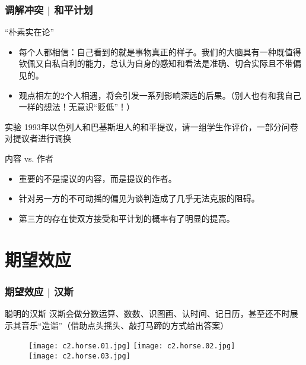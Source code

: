 \begin{frame}
  \frametitle{调解冲突 | 和平计划}
  \begin{block}{“朴素实在论”}
    \begin{itemize}
      \item 每个人都相信：自己看到的就是事物真正的样子。我们的大脑具有一种既值得钦佩又自私自利的能力，总认为自身的感知和看法是准确、切合实际且不带偏见的。
      \item 观点相左的2个人相遇，将会引发一系列影响深远的后果。（别人也有和我自己一样的想法！无意识“贬低”！）
    \end{itemize}
  \end{block}
  \vspace{-0.5em}
  \pause
  \begin{block}{实验}
    1993年以色列人和巴基斯坦人的和平提议，请一组学生作评价，一部分问卷对提议者进行调换
  \end{block}
  \vspace{-0.5em}
  \pause
  \begin{block}{\alert{内容 vs. 作者}}
    \begin{itemize}
      \item 重要的不是提议的内容，而是提议的作者。
      \item 针对另一方的不可动摇的偏见为谈判造成了几乎无法克服的阻碍。
      \item 第三方的存在使双方接受和平计划的概率有了明显的提高。
    \end{itemize}
  \end{block}
\end{frame}

\section{期望效应}
\begin{frame}
  \frametitle{期望效应 | 汉斯}
  \begin{block}{聪明的汉斯}
汉斯会做分数运算、数数、识图画、认时间、记日历，甚至还不时展示其音乐“造诣”（借助点头摇头、敲打马蹄的方式给出答案）
\vspace{-1em}
\begin{figure}
  \centering
  \texttt{[image: c2.horse.01.jpg]}\quad
  \texttt{[image: c2.horse.02.jpg]}\\
  \texttt{[image: c2.horse.03.jpg]}
\end{figure}
  \end{block}
\end{frame}

